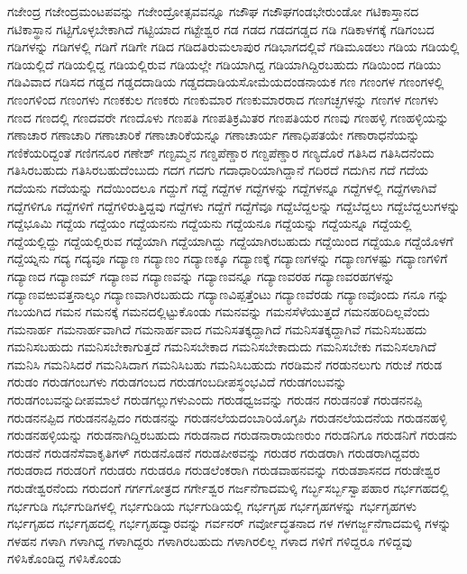 {ಗಜೇಂದ್ರ
ಗಜೇಂದ್ರಮಂಟಪವನ್ನು
ಗಜೇಂದ್ರೋತ್ಸವವನ್ನೂ
ಗಜೌಘ
ಗಜೌಘಗಂಡಭೇರುಂಡೋ
ಗಟಿಕಾಸ್ತಾನದ
ಗಟಿಕಾಸ್ಥಾನ
ಗಟ್ಟಿಗೊಳ್ಳಬೇಕಾಗಿದೆ
ಗಟ್ಟಿಯಾದ
ಗಟ್ಟೇಶ್ವರ
ಗಡ
ಗಡದ
ಗಡದಗಡ್ಡದ
ಗಡಿ
ಗಡಿಕಾಳಗಕ್ಕೆ
ಗಡಿಗಂಬದ
ಗಡಿಗಳನ್ನು
ಗಡಿಗಳಲ್ಲಿ
ಗಡಿಗೆ
ಗಡಿಗೇ
ಗಡಿದ
ಗಡಿದತಿರುಮಲಾಪುರ
ಗಡಿಭಾಗದಲ್ಲಿವೆ
ಗಡಿಮೂಡಲು
ಗಡಿಯ
ಗಡಿಯಲ್ಲಿ
ಗಡಿಯಲ್ಲಿದೆ
ಗಡಿಯಲ್ಲಿದ್ದ
ಗಡಿಯಲ್ಲಿರುವ
ಗಡಿಯಲ್ಲೇ
ಗಡಿಯಾಗಿದ್ದ
ಗಡಿಯಾಗಿದ್ದಿರಬಹುದು
ಗಡಿಯಿಂದ
ಗಡಿಯು
ಗಡಿವಿವಾದ
ಗಡಿಸದ
ಗಡ್ಡದ
ಗಡ್ಡದದಾಡಿಯ
ಗಡ್ಡದದಾಡಿಯಸೋಮೆಯದಂಡನಾಯಕ
ಗಣ
ಗಣಂಗಳ
ಗಣಂಗಳಲ್ಲಿ
ಗಣಂಗಳಿಂದ
ಗಣಂಗಳು
ಗಣಕಕುಲ
ಗಣಕರು
ಗಣಕುಮಾರ
ಗಣಕುಮಾರರಾದ
ಗಣಗಚ್ಛಗಳನ್ನು
ಗಣಗಳ
ಗಣಗಳು
ಗಣದ
ಗಣದಲ್ಲಿ
ಗಣದವರೇ
ಗಣದೊಳು
ಗಣಪತಿ
ಗಣಪತಿಕ್ರಮಿತರ
ಗಣಪತಿಯರ
ಗಣವು
ಗಣಹಳ್ಳಿ
ಗಣಹಳ್ಳಿಯನ್ನು
ಗಣಾಚಾರ
ಗಣಾಚಾರಿ
ಗಣಾಚಾರಿಕೆ
ಗಣಾಚಾರಿಕೆಯನ್ನೂ
ಗಣಾಚಾರ್ಯ
ಗಣಾಧಿಪತಯೇ
ಗಣಾರಾಧನೆಯನ್ನು
ಗಣಿಕೆಯರಿದ್ದಂತೆ
ಗಣಿಗನೂರ
ಗಣೇಶ್
ಗಣ್ಟಮ್ಮನ
ಗಣ್ಡಪೆಣ್ಡಾರ
ಗಣ್ದಪೆಣ್ಡಾರ
ಗಣ್ಯದೊರೆ
ಗತಿಸಿದ
ಗತಿಸಿದನೆಂದು
ಗತಿಸಿರಬಹುದು
ಗತಿಸಿರಬಹುದೆಂಬುದು
ಗದಗ
ಗದಗು
ಗದಾಧಾರಿಯಾಗಿದ್ದಾನೆ
ಗದಿರದೆ
ಗದುಗಿನ
ಗದೆ
ಗದೆಯ
ಗದೆಯನು
ಗದೆಯನ್ನು
ಗದೆಯಿಂದಲೂ
ಗದ್ದುಗೆ
ಗದ್ದೆ
ಗದ್ದೆಗಳ
ಗದ್ದೆಗಳನ್ನು
ಗದ್ದೆಗಳನ್ನೂ
ಗದ್ದೆಗಳಲ್ಲಿ
ಗದ್ದೆಗಳಾಗಿವೆ
ಗದ್ದೆಗಳಿಗೂ
ಗದ್ದೆಗಳಿಗೆ
ಗದ್ದೆಗಳಿರುತ್ತಿದ್ದವು
ಗದ್ದೆಗಳು
ಗದ್ದೆಗೆ
ಗದ್ದೆಗೆವೂ
ಗದ್ದೆಬೆದ್ದಲನ್ನು
ಗದ್ದೆಬೆದ್ದಲು
ಗದ್ದೆಬೆದ್ದಲುಗಳನ್ನು
ಗದ್ದೆಭೂಮಿ
ಗದ್ದೆಯ
ಗದ್ದೆಯಂ
ಗದ್ದೆಯನನು
ಗದ್ದೆಯನು
ಗದ್ದೆಯನೂ
ಗದ್ದೆಯನ್ನು
ಗದ್ದೆಯನ್ನೂ
ಗದ್ದೆಯಲ್ಲಿ
ಗದ್ದೆಯಲ್ಲಿದ್ದು
ಗದ್ದೆಯಲ್ಲಿರುವ
ಗದ್ದೆಯಾಗಿ
ಗದ್ದೆಯಾಗಿದ್ದು
ಗದ್ದೆಯಾಗಿರಬಹುದು
ಗದ್ದೆಯಿಂದ
ಗದ್ದೆಯೂ
ಗದ್ದೆಯೊಳಗೆ
ಗದ್ದೆಯ್ನನು
ಗದ್ಯ
ಗದ್ಯವೂ
ಗದ್ಯಾಣ
ಗದ್ಯಾಣಂ
ಗದ್ಯಾಣಕ್ಕೂ
ಗದ್ಯಾಣಕ್ಕೆ
ಗದ್ಯಾಣಗಳನ್ನು
ಗದ್ಯಾಣಗಳಷ್ಟು
ಗದ್ಯಾಣಗಳಿಗೆ
ಗದ್ಯಾಣದ
ಗದ್ಯಾಣಮ್
ಗದ್ಯಾಣವ
ಗದ್ಯಾಣವನ್ನು
ಗದ್ಯಾಣವನ್ನೂ
ಗದ್ಯಾಣವರಹ
ಗದ್ಯಾಣವರಹಗಳನ್ನು
ಗದ್ಯಾಣವಱುವತ್ತನಾಲ್ಕಂ
ಗದ್ಯಾಣವಾಗಿರಬಹುದು
ಗದ್ಯಾಣವಿಪ್ಪತ್ತೆಂಟು
ಗದ್ಯಾಣವೆರಡು
ಗದ್ಯಾಣವೊಂದು
ಗನೂ
ಗನ್ನು
ಗಬಯಗಿದ
ಗಮನ
ಗಮನಕ್ಕೆ
ಗಮನದಲ್ಲಿಟ್ಟುಕೊಂಡು
ಗಮನವನ್ನು
ಗಮನಸೆಳೆಯುತ್ತದೆ
ಗಮನಹರಿದಿಲ್ಲವೆಂದು
ಗಮನಾರ್ಹ
ಗಮನಾರ್ಹವಾಗಿದೆ
ಗಮನಾರ್ಹವಾದ
ಗಮನಿಸತಕ್ಕದ್ದಾಗಿದೆ
ಗಮನಿಸತಕ್ಕದ್ದಾಗಿವೆ
ಗಮನಿಸಬಹದು
ಗಮನಿಸಬಹುದು
ಗಮನಿಸಬೇಕಾಗುತ್ತದೆ
ಗಮನಿಸಬೇಕಾದ
ಗಮನಿಸಬೇಕಾದುದು
ಗಮನಿಸಬೇಕು
ಗಮನಿಸಲಾಗಿದೆ
ಗಮನಿಸಿ
ಗಮನಿಸಿದರೆ
ಗಮನಿಸಿದಾಗ
ಗಮನಿಸಿಬಹು
ಗಮನಿಸಿಬಹುದು
ಗರಡಿಮನೆ
ಗರಡುನಲುಗು
ಗರುಜೆ
ಗರುಡ
ಗರುಡಂ
ಗರುಡಗಂಬಗಳು
ಗರುಡಗಂಬದ
ಗರುಡಗಂಬದೀಪಸ್ಥಂಭವಿದೆ
ಗರುಡಗಂಬವನ್ನು
ಗರುಡಗಂಬವನ್ನುದೀಪಮಾಲೆ
ಗರುಡಗಲ್ಲುಗಳುಎಂದು
ಗರುಡಧ್ವಜವನ್ನು
ಗರುಡನ
ಗರುಡನಂತೆ
ಗರುಡನನಪ್ಪಿ
ಗರುಡನನಪ್ಪಿದ
ಗರುಡನನಪ್ಪಿದಂ
ಗರುಡನನ್ನು
ಗರುಡನಲೆಯದಂಬಾರಿಯೊಗ್ಳಪಿ
ಗರುಡನಲೆಯದನೆಯ
ಗರುಡನಹಳ್ಳಿ
ಗರುಡನಹಳ್ಳಿಯನ್ನು
ಗರುಡನಾಗಿದ್ದಿರಬಹುದು
ಗರುಡನಾದ
ಗರುಡನಾರಾಯಣರುಂ
ಗರುಡನಿಗೂ
ಗರುಡನಿಗೆ
ಗರುಡನು
ಗರುಡನೆ
ಗರುಡನೆಸೆವಾಕೃತಿಗಳ್
ಗರುಡನೊಡನೆ
ಗರುಡಪೀಠವನ್ನು
ಗರುಡರ
ಗರುಡರಾಗಿ
ಗರುಡರಾಗಿದ್ದವರು
ಗರುಡರಾದ
ಗರುಡರಿಗೆ
ಗರುಡರು
ಗರುಡರೂ
ಗರುಡಲೆಂಕರಾಗಿ
ಗರುಡವಾಹನವನ್ನು
ಗರುಡಶಾಸನದ
ಗರುಡೇಶ್ವರ
ಗರುಡೇಶ್ವರನೆಂದು
ಗರುದಂಗೆ
ಗರ್ಗಗೋತ್ರದ
ಗರ್ಗೇಶ್ವರ
ಗರ್ಜನೆಗಾದಮಳ್ಕಿ
ಗರ್ಬ್ಭಸರ್ಬ್ಬಸ್ವಾಪಹಾರ
ಗರ್ಭಗಹದಲ್ಲಿ
ಗರ್ಭಗುಡಿ
ಗರ್ಭಗುಡಿಗಳಲ್ಲಿ
ಗರ್ಭಗುಡಿಯ
ಗರ್ಭಗುಡಿಯಲ್ಲಿ
ಗರ್ಭಗೃಹ
ಗರ್ಭಗೃಹಗಳನ್ನು
ಗರ್ಭಗೃಹಗಳು
ಗರ್ಭಗೃಹದ
ಗರ್ಭಗೃಹದಲ್ಲಿ
ಗರ್ಭಗೃಹದ್ವಾರವನ್ನು
ಗರ್ವನರ್
ಗರ್ವೋದ್ಧತನಾದ
ಗಳ
ಗಳಗರ್ಜ್ಜನೆಗಾದಮಳ್ಕಿ
ಗಳನ್ನು
ಗಳಹನ
ಗಳಾಗಿ
ಗಳಾಗಿದ್ದ
ಗಳಾಗಿದ್ದರು
ಗಳಾಗಿರಬಹುದು
ಗಳಾಗಿರಲಿಲ್ಲ
ಗಳಾದ
ಗಳಿಗೆ
ಗಳಿದ್ದರೂ
ಗಳಿದ್ದವು
ಗಳಿಸಿಕೊಂಡಿದ್ದ
ಗಳಿಸಿಕೊಂಡು
}
